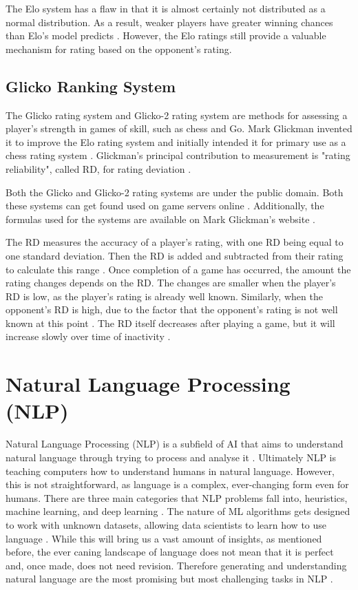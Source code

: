 		The Elo system has a flaw in that it is almost certainly not distributed as a normal distribution. As a result, weaker players have greater winning chances than Elo's model predicts \cite{weng2011bayesian}. However, the Elo ratings still provide a valuable mechanism for rating based on the opponent's rating.
	
	\subsection{Glicko Ranking System}
		The Glicko rating system \cite{glickman1995glicko} and Glicko-2 rating system \cite{glickman2012example} are methods for assessing a player's strength in games of skill, such as chess and Go. Mark Glickman invented it to improve the Elo rating system and initially intended it for primary use as a chess rating system \cite{glickman1995glicko}. Glickman's principal contribution to measurement is "rating reliability", called RD, for rating deviation \cite{glickman1995glicko}.
		
		Both the Glicko and Glicko-2 rating systems are under the public domain. Both these systems can get found used on game servers online \cite{williams2013abstracting}. Additionally, the formulas used for the systems are available on Mark Glickman's website \cite{glickman_website}.
	
		The RD measures the accuracy of a player's rating, with one RD being equal to one standard deviation. Then the RD is added and subtracted from their rating to calculate this range \cite{glickman2012example}. Once completion of a game has occurred, the amount the rating changes depends on the RD. The changes are smaller when the player's RD is low,  as the player's rating is already well known. Similarly, when the opponent's RD is high, due to the factor that the opponent's rating is not well known at this point \cite{glickman2012example}. The RD itself decreases after playing a game, but it will increase slowly over time of inactivity \cite{glickman2012example}.
	
	
	\section{Natural Language Processing (NLP)}
		Natural Language Processing (NLP) is a subfield of AI that aims to understand natural language through trying to process and analyse it \cite{vasiliev2020natural, vajjala2020practical}. Ultimately NLP is teaching computers how to understand humans in natural language. However, this is not straightforward, as language is a complex, ever-changing form even for humans. There are three main categories that NLP problems fall into, heuristics, machine learning, and deep learning \cite{vajjala2020practical}. The nature of ML algorithms gets designed to work with unknown datasets, allowing data scientists to learn how to use language \cite{vasiliev2020natural}. While this will bring us a vast amount of insights, as mentioned before, the ever caning landscape of language does not mean that it is perfect and, once made, does not need revision. Therefore generating and understanding natural language are the most promising but most challenging tasks in NLP \cite{vasiliev2020natural, vajjala2020practical}.
		
